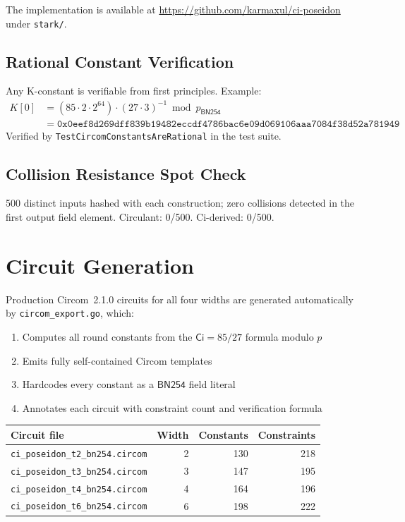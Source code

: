 \documentclass[preprint]{iacrtrans}
\newcommand{\Ci}{\ensuremath{\mathsf{Ci}}}
\newcommand{\BN}{\ensuremath{\mathsf{BN254}}}
\begin{document}
The implementation is available at
\url{https://github.com/karmaxul/ci-poseidon} under \texttt{stark/}.

\subsection{Rational Constant Verification}

Any K-constant is verifiable from first principles. Example:
\begin{align*}
K[0] &= (85 \cdot 2 \cdot 2^{64}) \cdot (27 \cdot 3)^{-1} \bmod p_{\BN} \\
     &= \mathtt{0x0eef8d269dff839b19482eccdf4786bac6e09d069106aaa7084f38d52a781949}
\end{align*}
Verified by \texttt{TestCircomConstantsAreRational} in the test suite.

\subsection{Collision Resistance Spot Check}

500 distinct inputs hashed with each construction; zero collisions detected
in the first output field element. Circulant: 0/500. Ci-derived: 0/500.

\section{Circuit Generation}

Production Circom~2.1.0 circuits for all four widths are generated
automatically by \texttt{circom\_export.go}, which:
\begin{enumerate}
  \item Computes all round constants from the $\Ci = 85/27$ formula modulo $p$
  \item Emits fully self-contained Circom templates
  \item Hardcodes every constant as a $\BN$ field literal
  \item Annotates each circuit with constraint count and verification formula
\end{enumerate}

\begin{center}
\begin{tabular}{lrrr}
\toprule
Circuit file & Width & Constants & Constraints \\
\midrule
\texttt{ci\_poseidon\_t2\_bn254.circom} & 2 & 130 & 218 \\
\texttt{ci\_poseidon\_t3\_bn254.circom} & 3 & 147 & 195 \\
\texttt{ci\_poseidon\_t4\_bn254.circom} & 4 & 164 & 196 \\
\texttt{ci\_poseidon\_t6\_bn254.circom} & 6 & 198 & 222 \\
\bottomrule
\end{tabular}
\end{center}
\end{document}
